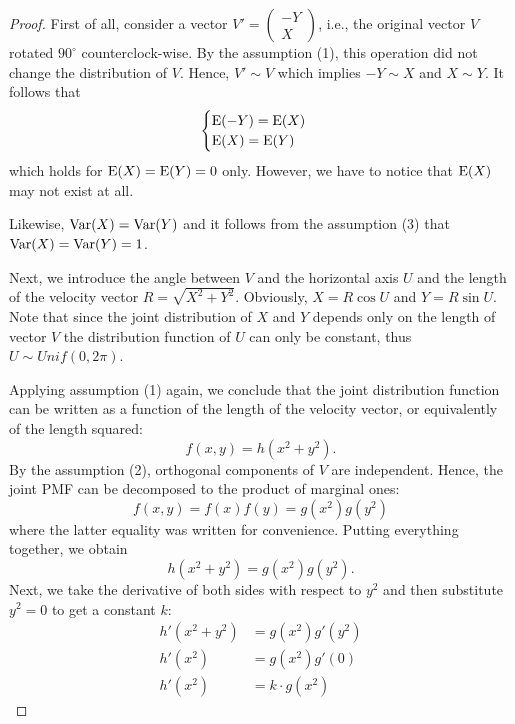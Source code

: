 \begin{proof}
First of all, consider a vector $V' = \begin{pmatrix} -Y \\ X \end{pmatrix}$, i.e.,
the original vector $V$ rotated $90^{\circ}$ counterclock-wise.
By the assumption (1), this operation did not change the distribution of $V$.
Hence, $V' \sim V$ which implies $-Y \sim X$ and $X \sim Y$.
It follows that
\[
\begin{cases}
\operatorname{E}(-Y) = \operatorname{E}(X) \\
\operatorname{E}(X) = \operatorname{E}(Y)
\end{cases}
\]
which holds for $\operatorname{E}(X) = \operatorname{E}(Y) = 0$ only.
However, we have to notice that $\operatorname{E}(X)$ may not exist at all.

Likewise, $\operatorname{Var}(X) = \operatorname{Var}(Y)$ and it follows from the assumption (3)
that $\operatorname{Var}(X) = \operatorname{Var}(Y) = 1$.

Next, we introduce the angle between $V$ and the horizontal axis $U$ and
the length of the velocity vector $R = \sqrt{X^2 + Y^2}$.
Obviously, $X = R \cos U$ and $Y = R \sin U$.
Note that since the joint distribution of $X$ and $Y$ depends only on
the length of vector $V$ the distribution function of $U$ can only be constant,
thus $U \sim Unif(0, 2\pi)$.

Applying assumption (1) again, we conclude that the joint distribution function
can be written as a function of the length of the velocity vector, or equivalently
of the length squared:
\[
f(x,y) = h(x^2 + y^2).
\]
By the assumption (2), orthogonal components of $V$ are independent.
Hence, the joint PMF can be decomposed to the product of marginal ones:
\[
f(x,y) = f(x)f(y) = g(x^2)g(y^2)
\]
where the latter equality was written for convenience.
Putting everything together, we obtain
\[
h(x^2 + y^2) = g(x^2)g(y^2).
\]
Next, we take the derivative of both sides with respect to $y^2$ and
then substitute $y^2 = 0$ to get a constant $k$:
\begin{align*}
h'(x^2 + y^2) &= g(x^2)g'(y^2) \\
h'(x^2) &= g(x^2)g'(0) \\
h'(x^2) &= k \cdot g(x^2)
\end{align*}



\end{proof}
